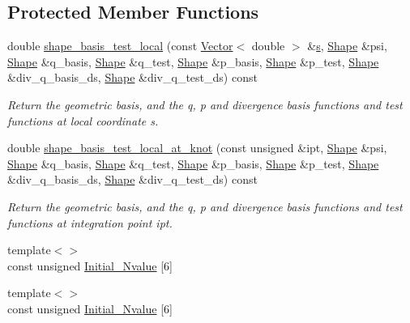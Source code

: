\subsection*{Protected Member Functions}
\begin{DoxyCompactItemize}
\item 
double \hyperlink{classoomph_1_1TRaviartThomasDarcyElement_abf52dcfe30546dd3e2617c1253580dfc}{shape\+\_\+basis\+\_\+test\+\_\+local} (const \hyperlink{classoomph_1_1Vector}{Vector}$<$ double $>$ \&\hyperlink{cfortran_8h_ab7123126e4885ef647dd9c6e3807a21c}{s}, \hyperlink{classoomph_1_1Shape}{Shape} \&psi, \hyperlink{classoomph_1_1Shape}{Shape} \&q\+\_\+basis, \hyperlink{classoomph_1_1Shape}{Shape} \&q\+\_\+test, \hyperlink{classoomph_1_1Shape}{Shape} \&p\+\_\+basis, \hyperlink{classoomph_1_1Shape}{Shape} \&p\+\_\+test, \hyperlink{classoomph_1_1Shape}{Shape} \&div\+\_\+q\+\_\+basis\+\_\+ds, \hyperlink{classoomph_1_1Shape}{Shape} \&div\+\_\+q\+\_\+test\+\_\+ds) const
\begin{DoxyCompactList}\small\item\em Return the geometric basis, and the q, p and divergence basis functions and test functions at local coordinate s. \end{DoxyCompactList}\item 
double \hyperlink{classoomph_1_1TRaviartThomasDarcyElement_afdb0540d59f54d7ef112a85a386f7991}{shape\+\_\+basis\+\_\+test\+\_\+local\+\_\+at\+\_\+knot} (const unsigned \&ipt, \hyperlink{classoomph_1_1Shape}{Shape} \&psi, \hyperlink{classoomph_1_1Shape}{Shape} \&q\+\_\+basis, \hyperlink{classoomph_1_1Shape}{Shape} \&q\+\_\+test, \hyperlink{classoomph_1_1Shape}{Shape} \&p\+\_\+basis, \hyperlink{classoomph_1_1Shape}{Shape} \&p\+\_\+test, \hyperlink{classoomph_1_1Shape}{Shape} \&div\+\_\+q\+\_\+basis\+\_\+ds, \hyperlink{classoomph_1_1Shape}{Shape} \&div\+\_\+q\+\_\+test\+\_\+ds) const
\begin{DoxyCompactList}\small\item\em Return the geometric basis, and the q, p and divergence basis functions and test functions at integration point ipt. \end{DoxyCompactList}\item 
{\footnotesize template$<$$>$ }\\const unsigned \hyperlink{classoomph_1_1TRaviartThomasDarcyElement_a4d20b781abfaec84f0333b4d2d0689f9}{Initial\+\_\+\+Nvalue} \mbox{[}6\mbox{]}
\item 
{\footnotesize template$<$$>$ }\\const unsigned \hyperlink{classoomph_1_1TRaviartThomasDarcyElement_a957b3a77d11af9264a82488bff00b493}{Initial\+\_\+\+Nvalue} \mbox{[}6\mbox{]}
\end{DoxyCompactItemize}
